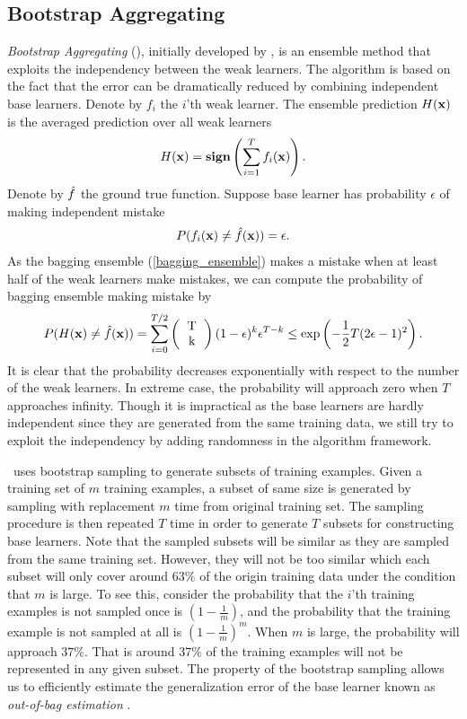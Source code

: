 {\subsection{Bootstrap Aggregating} \label{sc_ba}

\textit{Bootstrap Aggregating} (\bagging), initially developed by \citet{Breiman96bagging}, is an ensemble method that exploits the independency between the weak learners.
The algorithm is based on the fact that the error can be dramatically reduced by combining independent base learners.
Denote by $f_i$ the $i$'th weak learner.
The ensemble prediction $H(\mathbf {x})$ is the averaged prediction over all weak learners
\begin{align}
	H(\mathbf {x}) = \textbf{sign}\left(\sum_{i=1}^{T}f_i(\mathbf {x})\right). \label{bagging_ensemble}
\end{align}
Denote by ${\hat{f}}$ the ground true function.
Suppose base learner has probability $\epsilon$ of making independent mistake
\begin{align*}
	P(f_i(\mathbf {x}) \ne {\hat{f}}(\mathbf {x})) = \epsilon.
\end{align*}
As the bagging ensemble (\ref{bagging_ensemble}) makes a mistake when at least half of the weak learners make mistakes, we can compute the probability of bagging ensemble making mistake by
\begin{align*}
	P(H(\vx)\neq\hatf(\vx)) = \sum_{i=0}^{T/2}\left(\begin{tabular}{cc}T\\k\end{tabular}\right)(1-\epsilon)^k\epsilon^{T-k} \le\exp\left(-\frac{1}{2}T(2\epsilon-1)^2\right).
\end{align*}
It is clear that the probability decreases exponentially with respect to the number of the weak learners.
In extreme case, the probability will approach zero when $T$ approaches infinity.
Though it is impractical as the base learners are hardly independent since they are generated from the same training data, we still try to exploit the independency by adding randomness in the algorithm framework.

\bagging\ uses bootstrap sampling \citep{Efron1994introduction} to generate subsets of training examples.
Given a training set of $m$ training examples, a subset of same size is generated by sampling with replacement $m$ time from original training set.
The sampling procedure is then repeated $T$ time in order to generate $T$ subsets for constructing base learners.
Note that the sampled subsets will be similar as they are sampled from the same training set.
However, they will not be too similar which each subset will only cover around $63\%$ of the origin training data under the condition that $m$ is large.
To see this, consider the probability that the $i$'th training examples is not sampled once is $(1-\frac{1}{m})$, and the probability that the training example is not sampled at all is $(1-\frac{1}{m})^m$.
When $m$ is large, the probability will approach $37\%$. 
That is around $37\%$ of the training examples will not be represented in any given subset.
The property of the bootstrap sampling allows us to efficiently estimate the generalization error of the base learner known as \textit{out-of-bag estimation} \citep{Breiman96out,Tibshirani1996bias,Wolpert99an}.

}
